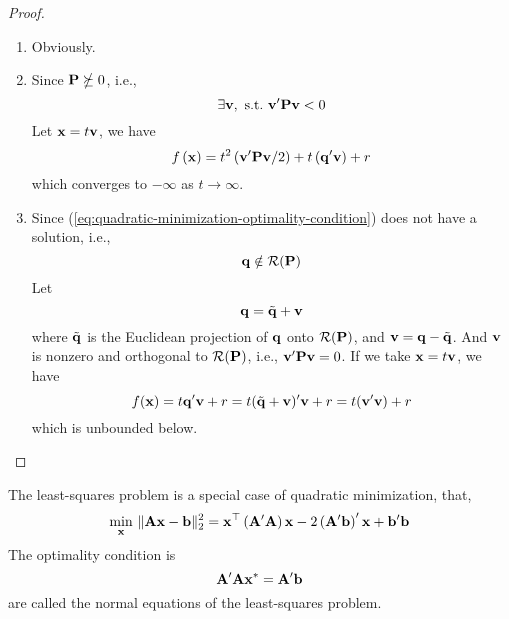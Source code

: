 \begin{proof}
	\hfill
	\begin{enumerate}
		\item
		      Obviously.

		\item
		      Since \(\mathbf{P}\nsucceq 0\), i.e.,
		      \begin{equation*}
			      \exists\bfv,\ \text{s.t.}\ \bfv^{\prime}\bfP\bfv<0
		      \end{equation*}
		      Let \(\mathbf{x}=t\mathbf{v}\), we have
		      \begin{equation*}
			      f\left(\mathbf{x}\right)=t^{2}\left(\mathbf{v}^{\prime}\mathbf{P}\mathbf{v}/2\right)+t\left(\mathbf{q}^{\prime}\mathbf{v}\right)+r
		      \end{equation*}
		      which converges to \(-\infty\) as \(t\rightarrow\infty\).

		\item
		      Since (\ref{eq:quadratic-minimization-optimality-condition}) does not have a solution, i.e.,
		      \begin{equation*}
			      \mathbf{q}\notin\mathcal{R}(\mathbf{P})
		      \end{equation*}
		      Let
		      \begin{equation*}
			      \mathbf{q}=\tilde{\mathbf{q}}+\mathbf{v}
		      \end{equation*}
		      where \(\tilde{\mathbf{q}}\) is the Euclidean projection of \(\mathbf{q}\) onto \(\mathcal{R}(\mathbf{P})\), and \(\mathbf{v}=\mathbf{q}-\tilde{\mathbf{q}}\). And \(\mathbf{v}\) is nonzero and orthogonal to \(\mathcal{R}(\mathbf{P})\), i.e., \(\mathbf{v}^{\prime}\mathbf{P}\mathbf{v}=0\). If we take \(\mathbf{x}=t\mathbf{v}\), we have
		      \begin{equation*}
			      f(\mathbf{x})=t\mathbf{q}^{\prime}\mathbf{v}+r=t(\tilde{\mathbf{q}}+\mathbf{v})^{\prime}\mathbf{v}+r=t(\mathbf{v}^{\prime}\mathbf{v})+r
		      \end{equation*}
		      which is unbounded below.
	\end{enumerate}
\end{proof}

\begin{remark}
	The least-squares problem is a special case of quadratic minimization, that,
	\begin{equation*}
		\min_{\mathbf{x}}\,\|\mathbf{A}\mathbf{x}-\mathbf{b}\|_{2}^{2}=\mathbf{x}^{\top}\left(\mathbf{A}^{\prime}\mathbf{A}\right)\mathbf{x}-2\left(\mathbf{A}^{\prime}\mathbf{b}\right)^{\prime}\mathbf{x}+\mathbf{b}^{\prime}\mathbf{b}
	\end{equation*}
	The optimality condition is
	\begin{equation*}
		\mathbf{A}^{\prime}\mathbf{A}\mathbf{x}^{*}=\mathbf{A}^{\prime}\mathbf{b}
	\end{equation*}
	are called the normal equations of the least-squares problem.
\end{remark}


